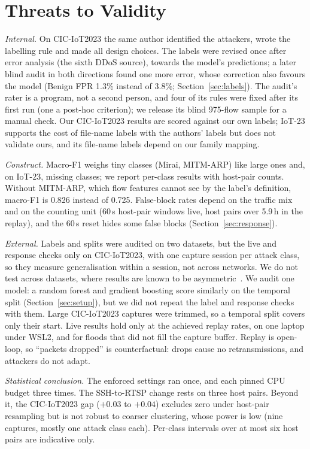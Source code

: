 \section{Threats to Validity}\label{sec:threats}

\emph{Internal.} On CIC-IoT2023 the same author identified the attackers, wrote the labelling rule and made all design choices. The labels were revised once after error analysis (the sixth DDoS source), towards the model's predictions; a later blind audit in both directions found one more error, whose correction also favours the model (Benign FPR 1.3\% instead of 3.8\%; Section~\ref{sec:labels}). The audit's rater is a program, not a second person, and four of its rules were fixed after its first run (one a post-hoc criterion); we release its blind 975-flow sample for a manual check. Our CIC-IoT2023 results are scored against our own labels; IoT-23 supports the cost of file-name labels with the authors' labels but does not validate ours, and its file-name labels depend on our family mapping.

\emph{Construct.} Macro-F1 weighs tiny classes (Mirai, MITM-ARP) like large ones and, on IoT-23, missing classes; we report per-class results with host-pair counts. Without MITM-ARP, which flow features cannot see by the label's definition, macro-F1 is 0.826 instead of 0.725. False-block rates depend on the traffic mix and on the counting unit (60\,s host-pair windows live, host pairs over 5.9\,h in the replay), and the 60\,s reset hides some false blocks (Section~\ref{sec:response}).

\emph{External.} Labels and splits were audited on two datasets, but the live and response checks only on CIC-IoT2023, with one capture session per attack class, so they measure generalisation within a session, not across networks. We do not test across datasets, where results are known to be asymmetric~\cite{ali2026siamxbert}. We audit one model: a random forest and gradient boosting score similarly on the temporal split (Section~\ref{sec:setup}), but we did not repeat the label and response checks with them. Large CIC-IoT2023 captures were trimmed, so a temporal split covers only their start. Live results hold only at the achieved replay rates, on one laptop under WSL2, and for floods that did not fill the capture buffer. Replay is open-loop, so ``packets dropped'' is counterfactual: drops cause no retransmissions, and attackers do not adapt.

\emph{Statistical conclusion.} The enforced settings ran once, and each pinned CPU budget three times. The SSH-to-RTSP change rests on three host pairs. Beyond it, the CIC-IoT2023 gap ($+0.03$ to $+0.04$) excludes zero under host-pair resampling but is not robust to coarser clustering, whose power is low (nine captures, mostly one attack class each). Per-class intervals over at most six host pairs are indicative only.

